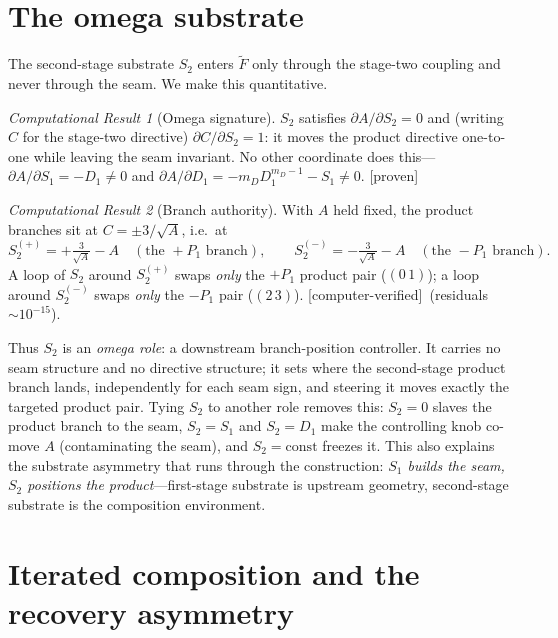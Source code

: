 \documentclass[11pt]{article}
\theoremstyle{plain}
\theoremstyle{definition}
\theoremstyle{remark}
\newtheorem{result}{Computational Result}
\newcommand{\Proven}{\textsf{[proven]}}
\newcommand{\Measured}{\textsf{[computer-verified]}}
\newcommand{\Ftil}{\widetilde{F}}
\begin{document}
\section{The omega substrate}
\label{sec:omega}

The second-stage substrate $S_2$ enters $\Ftil$ only through the stage-two
coupling and never through the seam. We make this quantitative.

\begin{result}[Omega signature]
\label{res:omega}
$S_2$ satisfies $\partial A/\partial S_2 = 0$ and (writing $C$ for the stage-two
directive) $\partial C/\partial S_2 = 1$: it moves the product directive one-to-one
while leaving the seam invariant. No other coordinate does this---
$\partial A/\partial S_1 = -D_1\neq 0$ and $\partial A/\partial D_1 = -m_D
D_1^{m_D-1}-S_1\neq 0$. \Proven
\end{result}

\begin{result}[Branch authority]
\label{res:authority}
With $A$ held fixed, the product branches sit at $C = \pm 3/\sqrt{A}$, i.e.\ at
\[
  S_2^{(+)} = +\tfrac{3}{\sqrt A}-A \quad(\text{the }{+}P_1\text{ branch}),\qquad
  S_2^{(-)} = -\tfrac{3}{\sqrt A}-A \quad(\text{the }{-}P_1\text{ branch}).
\]
A loop of $S_2$ around $S_2^{(+)}$ swaps \emph{only} the $+P_1$ product pair
($(0\,1)$); a loop around $S_2^{(-)}$ swaps \emph{only} the $-P_1$ pair
($(2\,3)$). \Measured\ (residuals $\sim10^{-15}$).
\end{result}

\noindent Thus $S_2$ is an \emph{omega role}: a downstream branch-position
controller. It carries no seam structure and no directive structure; it sets where
the second-stage product branch lands, independently for each seam sign, and
steering it moves exactly the targeted product pair. Tying $S_2$ to another role
removes this: $S_2{=}0$ slaves the product branch to the seam, $S_2{=}S_1$ and
$S_2{=}D_1$ make the controlling knob co-move $A$ (contaminating the seam), and
$S_2{=}\text{const}$ freezes it. This also explains the substrate asymmetry that
runs through the construction: \emph{$S_1$ builds the seam, $S_2$ positions the
product}---first-stage substrate is upstream geometry, second-stage substrate is
the composition environment.

\section{Iterated composition and the recovery asymmetry}
\label{sec:iterate}
\end{document}

